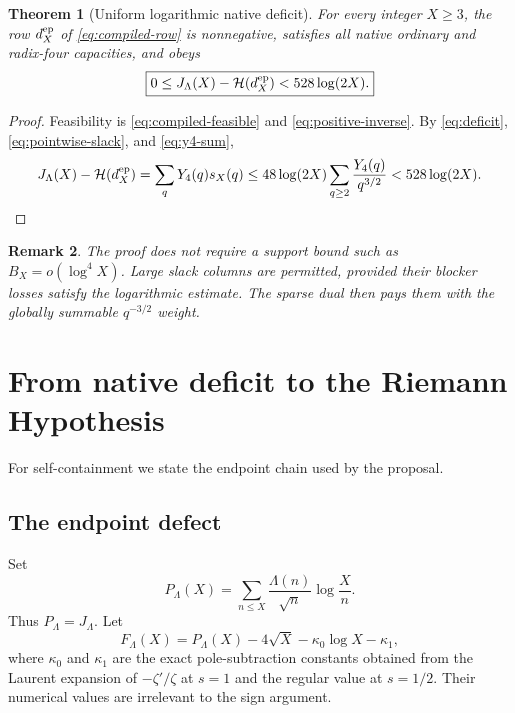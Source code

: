 \documentclass[11pt]{article}
\newtheorem{theorem}{Theorem}[section]
\newtheorem{remark}[theorem]{Remark}
\newcommand{\Yfour}{Y_4}
\newcommand{\Jnat}{J_\Lambda}
\newcommand{\Hscore}{\mathcal H}
\newcommand{\Lam}{\Lambda}
\begin{document}
\begin{theorem}[Uniform logarithmic native deficit]\label{thm:deficit}
For every integer $X\ge3$, the row $d_X^{\rm ep}$ of \eqref{eq:compiled-row} is nonnegative, satisfies all native ordinary and radix-four capacities, and obeys
\begin{equation}
 \boxed{
 0\le\Jnat(X)-\Hscore(d_X^{\rm ep})
 <528\log(2X).}
 \label{eq:main-deficit}
\end{equation}
\end{theorem}

\begin{proof}
Feasibility is \eqref{eq:compiled-feasible} and \eqref{eq:positive-inverse}. By \eqref{eq:deficit}, \eqref{eq:pointwise-slack}, and \eqref{eq:y4-sum},
\[
 \Jnat(X)-\Hscore(d_X^{\rm ep})
 =\sum_q\Yfour(q)s_X(q)
 \le48\log(2X)\sum_{q\ge2}\frac{\Yfour(q)}{q^{3/2}}
 <528\log(2X).
\]
\end{proof}

\begin{remark}
The proof does not require a support bound such as $B_X=o(\log^4X)$. Large slack columns are permitted, provided their blocker losses satisfy the logarithmic estimate. The sparse dual then pays them with the globally summable $q^{-3/2}$ weight.
\end{remark}

\section{From native deficit to the Riemann Hypothesis}

For self-containment we state the endpoint chain used by the proposal.

\subsection{The endpoint defect}

Set
\begin{equation}
 P_\Lambda(X)=\sum_{n\le X}\frac{\Lam(n)}{\sqrt n}\log\frac Xn.
 \label{eq:PLambda}
\end{equation}
Thus $P_\Lambda=\Jnat$. Let
\begin{equation}
 F_\Lambda(X)=P_\Lambda(X)-4\sqrt X-\kappa_0\log X-\kappa_1,
 \label{eq:Fdef}
\end{equation}
where $\kappa_0$ and $\kappa_1$ are the exact pole-subtraction constants obtained from the Laurent expansion of $-\zeta'/\zeta$ at $s=1$ and the regular value at $s=1/2$. Their numerical values are irrelevant to the sign argument.
\end{document}
